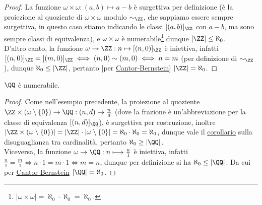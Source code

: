 \documentclass[11pt]{scrartcl}
\begin{document}
\begin{proof}
	La funzione $\omega \times \omega : (a,b) \mapsto a - b$ è surgettiva per definizione (è la proiezione al quoziente di $\omega \times \omega$ modulo $\sim_\ZZ$, che sappiamo essere sempre surgettiva, in questo caso stiamo indicando le classi $[(a,b)]_\ZZ$ con $a - b$, ma sono sempre classi di equivalenza), e $\omega \times \omega$ è numerabile\footnote{$|\omega \times \omega| = \aleph_0 \cdot \aleph_0 = \aleph_0$.} dunque $|\ZZ|\leq \aleph_0$.\\
	D'altro canto, la funzione $\omega \rightarrow \ZZ : n \mapsto [(n,0)]_\ZZ$ è iniettiva, infatti $[(n,0)]_\ZZ = [(m,0)]_\ZZ \iff (n,0) \sim (m,0) \iff n = m$ (per definizione di $\sim_\ZZ$), dunque $\aleph_0 \leq |\ZZ|$, pertanto [per \hyperref[CB]{Cantor-Bernstein}] $|\ZZ| = \aleph_0$.
\end{proof}

\begin{example}
	$\QQ$ è numerabile.
\end{example}

\begin{proof}
	Come nell'esempio precedente, la proiezione al quoziente $\ZZ \times (\omega \setminus\{0\}) \rightarrow \QQ : (n,d) \mapsto \frac{n}{d}$ (dove la frazione è un'abbreviazione per la classe di equivalenza $[(n,d)]_\QQ$), è surgettiva per costruzione, inoltre $|\ZZ \times (\omega \setminus\{0\})| = |\ZZ| \cdot |\omega \setminus\{0\}| = \aleph_0 \cdot \aleph_0 = \aleph_0$, dunque vale il 
	\hyperref[disugcardnum]{corollario} sulla disuguaglianza tra cardinalità, pertanto $\aleph_0 \geq |\QQ|$.\\
	Viceversa, la funzione $\omega \rightarrow \QQ : n \longmapsto \frac{n}{1}$ è iniettiva, infatti $\frac n1 = \frac m1 \iff n \cdot 1 = m \cdot 1 \iff m = n$, dunque per definizione si ha $\aleph_0 \leq |\QQ|$. Da cui per \hyperref[CB]{Cantor-Bernstein} $|\QQ| = \aleph_0$.
\end{proof}
\end{document}

